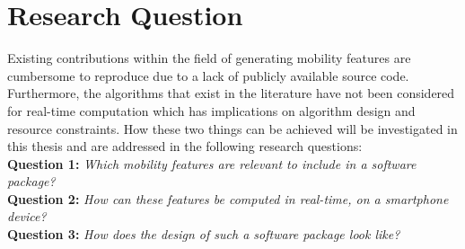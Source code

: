 \section{Research Question}

Existing contributions within the field of generating mobility features are cumbersome to reproduce due to a lack of publicly available source code. Furthermore, the algorithms that exist in the literature have not been considered for real-time computation which has implications on algorithm design and resource constraints. How these two things can be achieved will be investigated in this thesis and are addressed in the following research questions:\\

\textbf{Question 1:} \textit{Which mobility features are relevant to include in a software package?}\\

\textbf{Question 2:} \textit{How can these features be computed in real-time, on a smartphone device?}\\

\textbf{Question 3:} \textit{How does the design of such a software package look like?}\\

